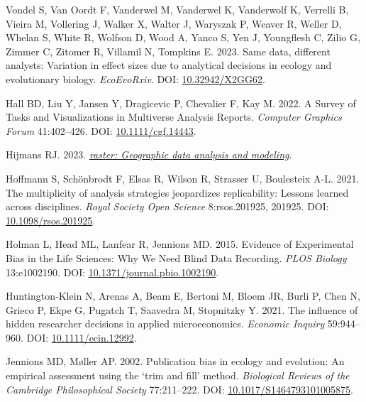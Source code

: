 \documentclass[10pt,a4paper]{article}
\newlength{\cslhangindent}
\newenvironment{CSLReferences}[2] %
 {\begin{list}{}{%
  \setlength{\itemindent}{0pt}
  \setlength{\leftmargin}{0pt}
  \setlength{\parsep}{0pt}
  \ifodd #1
   \setlength{\leftmargin}{\cslhangindent}
   \setlength{\itemindent}{-1\cslhangindent}
  \fi
  \setlength{\itemsep}{#2\baselineskip}}}
 {\end{list}}
\begin{document}
\begin{CSLReferences}{1}{0}
Vondel S, Van Oordt F, Vanderwel M, Vanderwel K, Vanderwolf K, Verrelli B, Vieira M, Vollering J, Walker X, Walter J, Waryszak P, Weaver R, Weller D, Whelan S, White R, Wolfson D, Wood A, Yanco S, Yen J, Youngflesh C, Zilio G, Zimmer C, Zitomer R, Villamil N, Tompkins E. 2023. Same data, different analysts: Variation in effect sizes due to analytical decisions in ecology and evolutionary biology. \emph{EcoEvoRxiv}. DOI: \href{https://doi.org/10.32942/X2GG62}{10.32942/X2GG62}.

Hall BD, Liu Y, Jansen Y, Dragicevic P, Chevalier F, Kay M. 2022. A {Survey} of {Tasks} and {Visualizations} in {Multiverse} {Analysis} {Reports}. \emph{Computer Graphics Forum} 41:402--426. DOI: \href{https://doi.org/10.1111/cgf.14443}{10.1111/cgf.14443}.

Hijmans RJ. 2023. \emph{\href{https://CRAN.R-project.org/package=raster}{{raster}: Geographic data analysis and modeling}}.

Hoffmann S, Schönbrodt F, Elsas R, Wilson R, Strasser U, Boulesteix A-L. 2021. The multiplicity of analysis strategies jeopardizes replicability: Lessons learned across disciplines. \emph{Royal Society Open Science} 8:rsos.201925, 201925. DOI: \href{https://doi.org/10.1098/rsos.201925}{10.1098/rsos.201925}.

Holman L, Head ML, Lanfear R, Jennions MD. 2015. Evidence of {Experimental} {Bias} in the {Life} {Sciences}: {Why} {We} {Need} {Blind} {Data} {Recording}. \emph{PLOS Biology} 13:e1002190. DOI: \href{https://doi.org/10.1371/journal.pbio.1002190}{10.1371/journal.pbio.1002190}.

Huntington‐Klein N, Arenas A, Beam E, Bertoni M, Bloem JR, Burli P, Chen N, Grieco P, Ekpe G, Pugatch T, Saavedra M, Stopnitzky Y. 2021. The influence of hidden researcher decisions in applied microeconomics. \emph{Economic Inquiry} 59:944--960. DOI: \href{https://doi.org/10.1111/ecin.12992}{10.1111/ecin.12992}.

Jennions MD, Møller AP. 2002. Publication bias in ecology and evolution: An empirical assessment using the `trim and fill' method. \emph{Biological Reviews of the Cambridge Philosophical Society} 77:211--222. DOI: \href{https://doi.org/10.1017/S1464793101005875}{10.1017/S1464793101005875}.


\end{CSLReferences}
\end{document}
